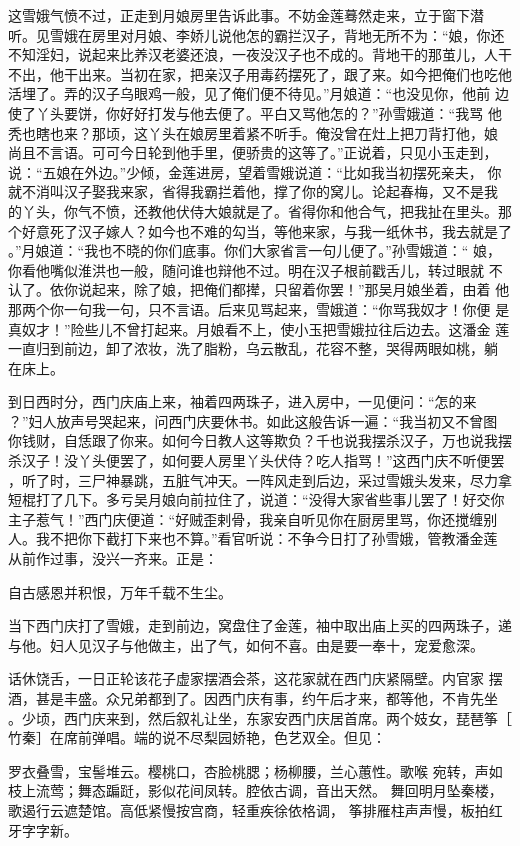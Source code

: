 这雪娥气愤不过，正走到月娘房里告诉此事。不妨金莲蓦然走来，立于窗下潜
听。见雪娥在房里对月娘、李娇儿说他怎的霸拦汉子，背地无所不为：“娘，你还
不知淫妇，说起来比养汉老婆还浪，一夜没汉子也不成的。背地干的那茧儿，人干
不出，他干出来。当初在家，把亲汉子用毒药摆死了，跟了来。如今把俺们也吃他
活埋了。弄的汉子乌眼鸡一般，见了俺们便不待见。”月娘道：“也没见你，他前
边使了丫头要饼，你好好打发与他去便了。平白又骂他怎的？”孙雪娥道：“我骂
他秃也瞎也来？那顷，这丫头在娘房里着紧不听手。俺没曾在灶上把刀背打他，娘
尚且不言语。可可今日轮到他手里，便骄贵的这等了。”正说着，只见小玉走到，
说：“五娘在外边。”少倾，金莲进房，望着雪娥说道：“比如我当初摆死亲夫，
你就不消叫汉子娶我来家，省得我霸拦着他，撑了你的窝儿。论起春梅，又不是我
的丫头，你气不愤，还教他伏侍大娘就是了。省得你和他合气，把我扯在里头。那
个好意死了汉子嫁人？如今也不难的勾当，等他来家，与我一纸休书，我去就是了
。”月娘道：“我也不晓的你们底事。你们大家省言一句儿便了。”孙雪娥道：“
娘，你看他嘴似淮洪也一般，随问谁也辩他不过。明在汉子根前戳舌儿，转过眼就
不认了。依你说起来，除了娘，把俺们都撵，只留着你罢！”那吴月娘坐着，由着
他那两个你一句我一句，只不言语。后来见骂起来，雪娥道：“你骂我奴才！你便
是真奴才！”险些儿不曾打起来。月娘看不上，使小玉把雪娥拉往后边去。这潘金
莲一直归到前边，卸了浓妆，洗了脂粉，乌云散乱，花容不整，哭得两眼如桃，躺
在床上。

到日西时分，西门庆庙上来，袖着四两珠子，进入房中，一见便问：“怎的来
？”妇人放声号哭起来，问西门庆要休书。如此这般告诉一遍：“我当初又不曾图
你钱财，自恁跟了你来。如何今日教人这等欺负？千也说我摆杀汉子，万也说我摆
杀汉子！没丫头便罢了，如何要人房里丫头伏侍？吃人指骂！”这西门庆不听便罢
，听了时，三尸神暴跳，五脏气冲天。一阵风走到后边，采过雪娥头发来，尽力拿
短棍打了几下。多亏吴月娘向前拉住了，说道：“没得大家省些事儿罢了！好交你
主子惹气！”西门庆便道：“好贼歪剌骨，我亲自听见你在厨房里骂，你还搅缠别
人。我不把你下截打下来也不算。”看官听说：不争今日打了孙雪娥，管教潘金莲
从前作过事，没兴一齐来。正是：

自古感恩并积恨，万年千载不生尘。

当下西门庆打了雪娥，走到前边，窝盘住了金莲，袖中取出庙上买的四两珠子，递
与他。妇人见汉子与他做主，出了气，如何不喜。由是要一奉十，宠爱愈深。

话休饶舌，一日正轮该花子虚家摆酒会茶，这花家就在西门庆紧隔壁。内官家
摆酒，甚是丰盛。众兄弟都到了。因西门庆有事，约午后才来，都等他，不肯先坐
。少顷，西门庆来到，然后叙礼让坐，东家安西门庆居首席。两个妓女，琵琶筝［
竹秦］在席前弹唱。端的说不尽梨园娇艳，色艺双全。但见：

罗衣叠雪，宝髻堆云。樱桃口，杏脸桃腮；杨柳腰，兰心蕙性。歌喉
宛转，声如枝上流莺；舞态蹁跹，影似花间凤转。腔依古调，音出天然。
舞回明月坠秦楼，歌遏行云遮楚馆。高低紧慢按宫商，轻重疾徐依格调，
筝排雁柱声声慢，板拍红牙字字新。

